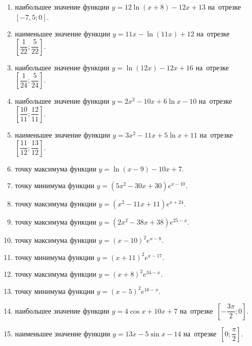 \documentclass[a4paper,10pt]{article}
\begin{document}
\begin{enumerate}
\item {} наибольшее значение функции $y = 12\ln \left(x+8\right)-12x +13$ на~отрезке~$\left[-7,5;0\right]$.

\item {} наименьшее значение функции $y = 11x-\ln \left(11x\right)+12$ на~отрезке~$\left[\dfrac{1}{22};\dfrac{5}{22}\right]$.

\item {} наибольшее значение функции $y = \ln \left(12x\right)-12x+16$ на~отрезке~$\left[\dfrac{1}{24};\dfrac{5}{24}\right]$.

\item {} наибольшее значение функции $y=2x^2-10x+6\ln x-10$ на~отрезке~$\left[\dfrac{10}{11};\dfrac{12}{11}\right]$.

\item {} наименьшее значение функции $y=3x^2-11x+5\ln x+11$ на~отрезке~$\left[\dfrac{11}{12};\dfrac{13}{12}\right]$.

\item {} точку максимума функции $y=\ln \left(x-9\right)-10x+7$.

\item {} точку минимума функции $y=\left(5x^2-30x+30\right)e^{x-10}$.

\item {} точку максимума функции $y=\left(x^2-11x+11\right)e^{x+24}$.

\item {} точку максимума функции $y=\left(2x^2-38x+38\right)e^{25-x}$.

\item {} точку максимума функции $y=\left(x -10\right)^2e^{x-8}$.

\item {} точку минимума функции $y=\left(x +11\right)^2e^{x-17}$.

\item {} точку максимума функции $y=\left(x +8\right)^2e^{34-x}$.

\item {} точку минимума функции $y=\left(x -5\right)^2e^{16-x}$.

\item {} наибольшее значение функции $y=4\cos x+10x +7$ на~отрезке~$\left[-\dfrac{3\pi }{2};0\right]$.

\item {} наименьшее значение функции $y=13x-5\sin x -14$ на~отрезке~$\left[0;\dfrac{\pi }{2}\right]$.


\end{enumerate}
\end{document}
